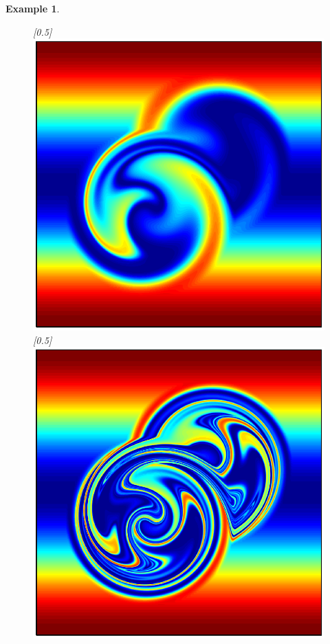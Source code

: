 \documentclass{article}
\newtheorem{example}{Example}
\begin{document}
\begin{example}
\begin{figure}
 \centerline{
  \scalebox{0.5}[0.5]{\includegraphics{ltmiter20.eps}}
  \scalebox{0.5}[0.5]{\includegraphics{ltmiter60.eps}}
}
\end{figure}
\end{example}
\end{document}
